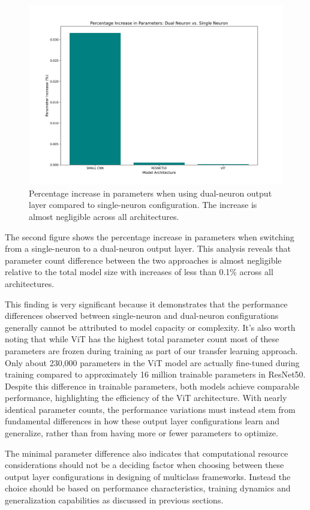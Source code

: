 \begin{figure}[htbp]
\centering
\includegraphics[width=\textwidth]{figures/parameter_increase_percentage.png}
\caption{Percentage increase in parameters when using dual-neuron output layer compared to single-neuron configuration. The increase is almost negligible across all architectures.}
\end{figure}

The second figure shows the percentage increase in parameters when switching from a single-neuron to a dual-neuron output layer. This analysis reveals that parameter count difference between the two approaches is almost negligible relative to the total model size with increases of less than 0.1\% across all architectures.

This finding is very significant because it demonstrates that the performance differences observed between single-neuron and dual-neuron configurations generally cannot be attributed to model capacity or complexity. It's also worth noting that while ViT has the highest total parameter count most of these parameters are frozen during training as part of our transfer learning approach. Only about 230,000 parameters in the ViT model are actually fine-tuned during training compared to approximately 16 million trainable parameters in ResNet50. Despite this difference in trainable parameters, both models achieve comparable performance, highlighting the efficiency of the ViT architecture. With nearly identical parameter counts, the performance variations must instead stem from fundamental differences in how these output layer configurations learn and generalize, rather than from having more or fewer parameters to optimize.

The minimal parameter difference also indicates that computational resource considerations should not be a deciding factor when choosing between these output layer configurations in designing of multiclass frameworks. Instead the choice should be based on performance characteristics, training dynamics and generalization capabilities as discussed in previous sections.
